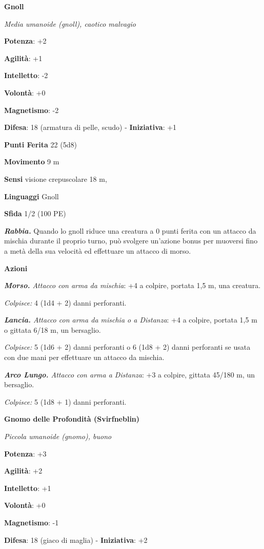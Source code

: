 \begin{multicols}{2}
\textbf{Gnoll}

\emph{Media umanoide (gnoll), caotico malvagio}

\textbf{Potenza}: +2

\textbf{Agilità}: +1

\textbf{Intelletto}: -2

\textbf{Volontà}: +0

\textbf{Magnetismo}: -2

\textbf{Difesa}: 18 (armatura di pelle, scudo) - \textbf{Iniziativa}: +1

\textbf{Punti Ferita} 22 (5d8)

\textbf{Movimento} 9 m

\textbf{Sensi} visione crepuscolare 18 m, 

\textbf{Linguaggi} Gnoll

\textbf{Sfida} 1/2 (100 PE)

\emph{\textbf{Rabbia.}} Quando lo gnoll riduce una creatura a 0 punti
ferita con un attacco da mischia durante il proprio turno, può svolgere
un'azione bonus per muoversi fino a metà della sua velocità ed
effettuare un attacco di morso.

\textbf{Azioni}

\emph{\textbf{Morso.} Attacco con arma da mischia}: +4 a colpire,
portata 1,5 m, una creatura.

\emph{Colpisce:} 4 (1d4 + 2) danni perforanti.

\emph{\textbf{Lancia.} Attacco con arma da mischia o a Distanza}: +4 a
colpire, portata 1,5 m o gittata 6/18 m, un bersaglio.

\emph{Colpisce:} 5 (1d6 + 2) danni perforanti o 6 (1d8 + 2) danni
perforanti se usata con due mani per effettuare un attacco da mischia.

\emph{\textbf{Arco Lungo.} Attacco con arma a Distanza}: +3 a colpire,
gittata 45/180 m, un bersaglio.

\emph{Colpisce:} 5 (1d8 + 1) danni perforanti.

\textbf{Gnomo delle Profondità (Svirfneblin)}

\emph{Piccola umanoide (gnomo), buono}

\textbf{Potenza}: +3

\textbf{Agilità}: +2

\textbf{Intelletto}: +1

\textbf{Volontà}: +0

\textbf{Magnetismo}: -1

\textbf{Difesa}: 18 (giaco di maglia) - \textbf{Iniziativa}: +2


\end{multicols}
